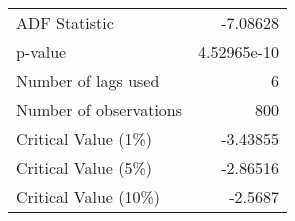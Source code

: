 \begin{tabular}{lr}
\toprule
 ADF Statistic          &  -7.08628     \\
 p-value                &   4.52965e-10 \\
 Number of lags used    &   6           \\
 Number of observations & 800           \\
 Critical Value (1\%)    &  -3.43855     \\
 Critical Value (5\%)    &  -2.86516     \\
 Critical Value (10\%)   &  -2.5687      \\
\bottomrule
\end{tabular}